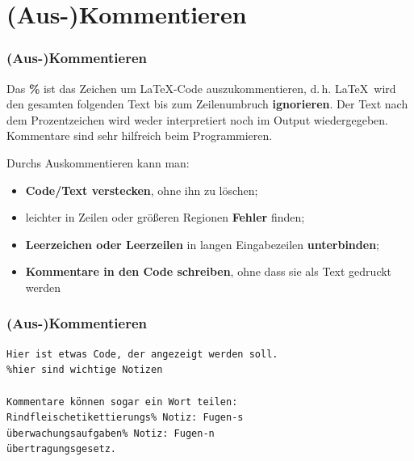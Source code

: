 \section{(Aus-)Kommentieren}

\begin{frame}
\frametitle{(Aus-)Kommentieren}

Das \textbf{\%} ist das Zeichen um \LaTeX -Code auszukommentieren, d.\,h. \LaTeX\ wird den gesamten folgenden Text bis zum Zeilenumbruch \textbf{ignorieren}. Der Text nach dem Prozentzeichen wird weder interpretiert noch im Output wiedergegeben. Kommentare sind sehr hilfreich beim Programmieren. 

Durchs Auskommentieren kann man:

\begin{itemize}
\item \textbf{Code/Text verstecken}, ohne ihn zu löschen;

\item leichter in Zeilen oder größeren Regionen \textbf{Fehler} finden;

\item \textbf{Leerzeichen oder Leerzeilen} in langen Eingabezeilen \textbf{unterbinden};

\item \textbf{Kommentare in den Code schreiben}, ohne dass sie als Text gedruckt werden

\end{itemize}

\end{frame}


\begin{frame}[fragile]
\frametitle{(Aus-)Kommentieren}

\begin{lstlisting}
Hier ist etwas Code, der angezeigt werden soll.
%hier sind wichtige Notizen

Kommentare können sogar ein Wort teilen: 
Rindfleischetikettierungs% Notiz: Fugen-s
überwachungsaufgaben% Notiz: Fugen-n
übertragungsgesetz. 
\end{lstlisting}


\end{frame}


